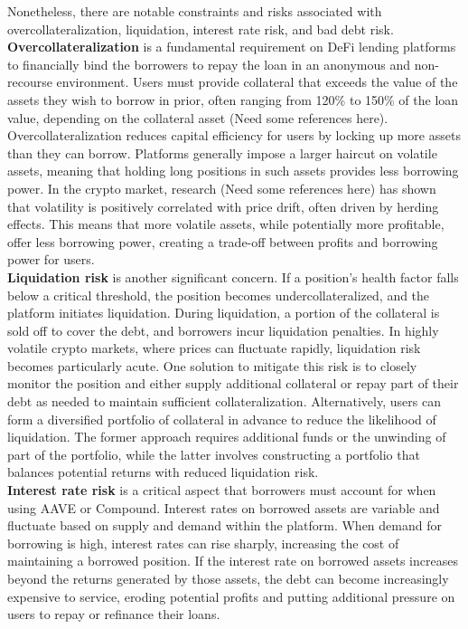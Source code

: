 \documentclass{article} %
\providecommand{\red}[1]{\textcolor{BrickRed}{#1}}
\theoremstyle{plain}
\theoremstyle{definition} %
\begin{document}
Nonetheless, there are notable constraints and risks associated with overcollateralization, liquidation, interest rate risk, and bad debt risk. \\ 

{\bf Overcollateralization} is a fundamental requirement on DeFi lending platforms to financially bind the borrowers to repay the loan in an anonymous and non-recourse environment.
 Users must provide collateral that exceeds the value of the assets they wish to borrow in prior, often ranging from 120\% to 150\% of the loan value, depending on the collateral asset \red{(Need some references here)}.
 Overcollateralization reduces capital efficiency for users by locking up more assets than they can borrow.
 Platforms generally impose a larger haircut on volatile assets, meaning that holding long positions in such assets provides less borrowing power.
 In the crypto market, research \red{(Need some references here)} has shown that volatility is positively correlated with price drift, often driven by herding effects.
 This means that more volatile assets, while potentially more profitable, offer less borrowing power,
 creating a trade-off between profits and borrowing power for users. \\
  
{\bf Liquidation risk} is another significant concern. 
 If a position's health factor falls below a critical threshold, the position becomes undercollateralized, and the platform initiates liquidation.
 During liquidation, a portion of the collateral is sold off to cover the debt, and borrowers incur liquidation penalties. 
 In highly volatile crypto markets, where prices can fluctuate rapidly, liquidation risk becomes particularly acute.
 One solution to mitigate this risk is to closely monitor the position and either supply additional collateral or repay part of their debt as needed to maintain sufficient collateralization. 
 Alternatively, users can form a diversified portfolio of collateral in advance to reduce the likelihood of liquidation. 
 The former approach requires additional funds or the unwinding of part of the portfolio, while the latter involves constructing a portfolio that balances potential returns with reduced liquidation risk. \\

{\bf Interest rate risk} is a critical aspect that borrowers must account for when using AAVE or Compound.
 Interest rates on borrowed assets are variable and fluctuate based on supply and demand within the platform.
 When demand for borrowing is high, interest rates can rise sharply, increasing the cost of maintaining a borrowed position.
 If the interest rate on borrowed assets increases beyond the returns generated by those assets, the debt can become increasingly expensive to service, 
 eroding potential profits and putting additional pressure on users to repay or refinance their loans. \\
 
\end{document}
